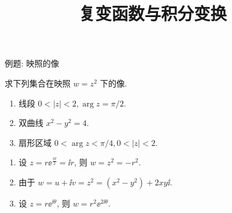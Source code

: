 \documentclass[aspectratio=169]{ctexbeamer}
\title{复变函数与积分变换}
\begin{document}
\begin{frame}{例题: 映照的像}\small
	\pause
	\begin{example}[nearnext]
		求下列集合在映照 $w=z^2$ 下的像.
		\begin{enumerate}
			\item 线段 $0<|z|<2,\arg z=\pi/2$.
			\item 双曲线 $x^2-y^2=4$.
			\item 扇形区域 $0<\arg z<\pi/4,0<|z|<2$.
		\end{enumerate}
	\end{example}
	\pause
	\begin{solution}[nearprev]
		\begin{enumerate}
			\item 设 $z=r\ee^{\frac{\pi\ii}2}=\ii r$, 则 $w=z^2=-r^2$.
			\item 由于 $w=u+\ii v=z^2=(x^2-y^2)+2xy\ii$.
			\item 设 $z=r\ee^{\ii\theta}$, 则 $w=r^2\ee^{2\ii\theta}$.
		\end{enumerate}
	\end{solution}
\end{frame}
\end{document}
